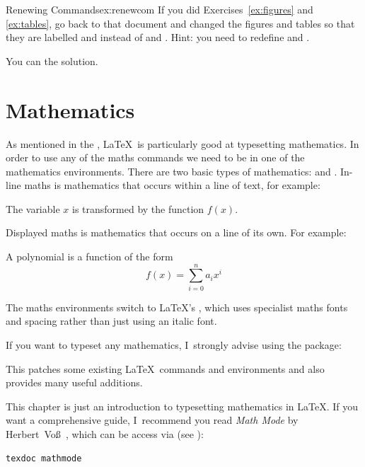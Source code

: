 \begin{exercise}{Renewing Commands}{ex:renewcom}
If you did Exercises~\ref{ex:figures} and \ref{ex:tables}, go back to
that document and changed the figures and tables so that they
are labelled  and  instead of  and .
Hint: you need to redefine  and .

You can  the solution.
\end{exercise}


\chapter{Mathematics}
\label{ch:maths}

As mentioned in the , \LaTeX\ is
particularly good at typesetting mathematics.  In order to
use any of the maths commands we need to be in one of the
mathematics \glspl{environment}.  There are two
basic types of mathematics:  and
. In-line maths is mathematics that
occurs within a line of text, for example:
\begin{resultS}
The variable $x$ is transformed by the function $f(x)$.
\end{resultS}%
Displayed maths is mathematics that occurs on a line
of its own.  For example:
\begin{result}
A polynomial is a function of the form
\[
f(x) = \sum_{i=0}^na_ix^i
\]
\end{result}
The maths environments switch to \LaTeX's , which uses
specialist maths fonts and spacing rather than just using an italic
font.

If you want to typeset any mathematics, I~strongly advise using the
 package:
\begin{alltt}
\end{alltt}
This patches some existing \LaTeX\ commands and environments and
also provides many useful additions.

This chapter is just an introduction to typesetting mathematics in
\LaTeX. If you want a comprehensive guide, I~recommend you read \emph{Math Mode}
by Herbert~Vo\ss~\cite{voss}, which can be access via
 (see ):
\begin{verbatim}
texdoc mathmode
\end{verbatim}

